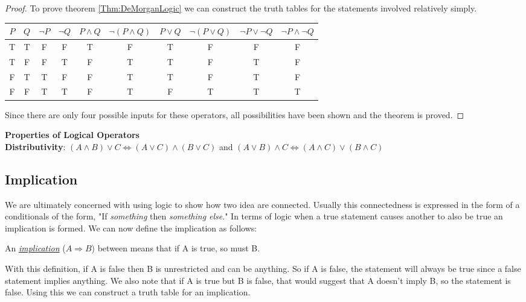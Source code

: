 \begin{proof}
	To prove theorem \ref{Thm:DeMorganLogic} we can construct the truth tables for the statements involved relatively simply.
	\begin{table*}[ht]
	\begin{center}
	\begin{tabular}{cc|cc|cccccc}
			$P$ & $Q$ & $\neg P$ & $\neg Q$ & $P \land Q$ & $\neg (P \land Q)$ & $P \lor Q$ & $\neg (P \lor Q)$ & $\neg P \lor \neg Q$ & $\neg P \land \neg Q$ \\
			\hline
			T & T & F & F & T & F & T & F & F & F \\
			T & F & F & T & F & T & T & F & T & F \\
			F & T & T & F & F & T & T & F & T & F \\
			F & F & T & T & F & T & F & T & T & T \\
	\end{tabular}
	\end{center}
	\end{table*}
	Since there are only four possible inputs for these operators, all possibilities have been shown and the theorem is proved.
\end{proof}

\begin{thm}
	\textbf{Properties of Logical Operators}\\
	\label{thm:proplogical}
	\textbf{Distributivity}: $(A \land B) \lor C \iff (A \lor C) \land (B \lor C)$ and $(A \lor B) \land C \iff (A \land C) \lor (B \land C)$
	
\end{thm}

\subsection{Implication}
We are ultimately concerned with using logic to show how two idea are connected.
Usually this connectedness is expressed in the form of a conditionals of the form, "If \emph{something} then \emph{something else}."
In terms of logic when a true statement causes another to also be true an implication is formed.
We can now define the implication as follows:

\begin{defn}
	An \emph{\underline{implication}} ($A \Rightarrow B$) between means that if A is true, so must B.
\end{defn}
With this definition, if A is false then B is unrestricted and can be anything.
So if A is false, the statement will always be true since a false statement implies anything.
We also note that if A is true but B is false, that would suggest that A doesn't imply B, so the statement is false.
Using this we can construct a truth table for an implication.

